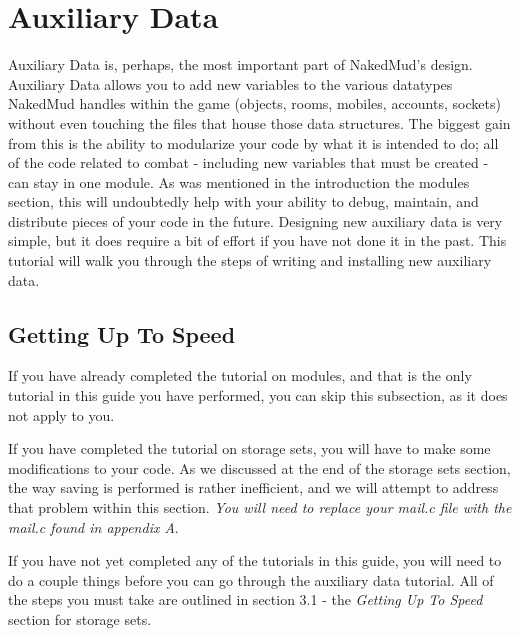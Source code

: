 \documentclass[12pt]{article}
\begin{document}
\newpage \section{Auxiliary Data}
Auxiliary Data is, perhaps, the most important part of NakedMud's design. Auxiliary Data allows you to add new variables to the various datatypes NakedMud handles within the game (objects, rooms, mobiles, accounts, sockets) without even touching the files that house those data structures. The biggest gain from this is the ability to modularize your code by what it is intended to do; all of the code related to combat - including new variables that must be created - can stay in one module. As was mentioned in the introduction the modules section, this will undoubtedly help with your ability to debug, maintain, and distribute pieces of your code in the future. Designing new auxiliary data is very simple, but it does require a bit of effort if you have not done it in the past. This tutorial will walk you through the steps of writing and installing new auxiliary data.



\subsection{Getting Up To Speed}
If you have already completed the tutorial on modules, and that is the only tutorial in this guide you have performed, you can skip this subsection, as it does not apply to you.

If you have completed the tutorial on storage sets, you will have to make some modifications to your code. As we discussed at the end of the storage sets section, the way saving is performed is rather inefficient, and we will attempt to address that problem within this section. {\it You will need to replace your mail.c file with the mail.c found in appendix A}.

If you have not yet completed any of the tutorials in this guide, you will need to do a couple things before you can go through the auxiliary data tutorial. All of the steps you must take are outlined in section 3.1 - the {\it Getting Up To Speed} section for storage sets.
\end{document}
